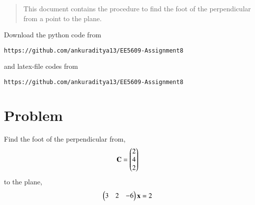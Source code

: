 \documentclass[journal,12pt,twocolumn]{IEEEtran}
\begin{document}
\begin{abstract}
This document contains the procedure to find the foot of the perpendicular from a point to the plane.
\end{abstract}
Download the python code from 
\begin{lstlisting}
https://github.com/ankuraditya13/EE5609-Assignment8
\end{lstlisting}
%
and latex-file codes from 
%
\begin{lstlisting}
https://github.com/ankuraditya13/EE5609-Assignment8
\end{lstlisting}

\section{Problem}
Find the foot of the perpendicular from,
\begin{align}
\mathbf{C} = \begin{pmatrix}2\\4\\2\end{pmatrix}
\end{align} 
to the plane,
\begin{align}
\begin{pmatrix}3&2&-6\end{pmatrix}\mathbf{x} = 2
\label{Q}
\end{align}
\end{document}
